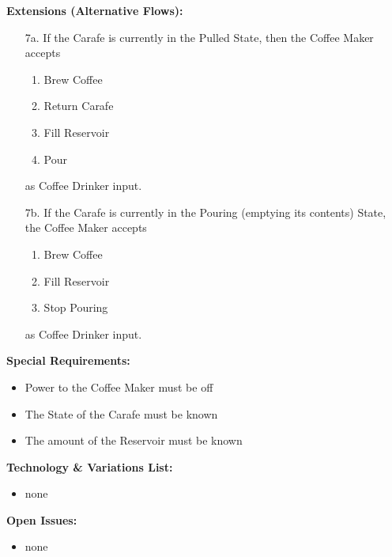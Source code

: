 \documentclass[letterpaper]{article}
\begin{document}
\textbf{Extensions (Alternative Flows):}
\begin{itemize}
\item[7a.]If the Carafe is currently in the Pulled State, then the
Coffee Maker accepts
\begin{enumerate}
\item Brew Coffee
\item Return Carafe
\item Fill Reservoir
\item Pour
\end{enumerate}
as Coffee Drinker input.
\item[7b.]If the Carafe is currently in the Pouring (emptying its
contents) State, the Coffee Maker accepts
\begin{enumerate}
\item Brew Coffee
\item Fill Reservoir
\item Stop Pouring
\end{enumerate}
as Coffee Drinker input.
\end{itemize}
\textbf{Special Requirements: }
\begin{itemize}
\item Power to the Coffee Maker must be off
\item The State of the Carafe must be known
\item The amount of the Reservoir must be known
\end{itemize}
\textbf{Technology \& Variations List:}
\begin{itemize}
\item none
\end{itemize}
\textbf{Open Issues:}
\begin{itemize}
\item none
\end{itemize}
\end{document}
